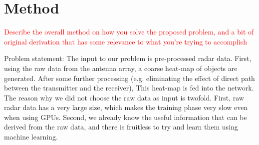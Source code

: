 \section{ Method}
\textcolor{red}{
Describe the overall method on how you solve the proposed problem, and a bit of original derivation that has some relevance to what you’re trying to accomplish
}

Problem statement:
The input to our problem is pre-processed radar data. First, using the raw data from the antenna array, a coarse heat-map of objects are generated. After some further processing (e.g. eliminating the effect of direct path between the transmitter and the receiver), This heat-map is fed into the network. The reason why we did not choose the raw data as input is twofold. First, raw radar data has a very large size, which makes the training phase very slow even when using GPUs. Second, we already know the useful information that can be derived from the raw data, and there is fruitless to try and learn them using machine learning.